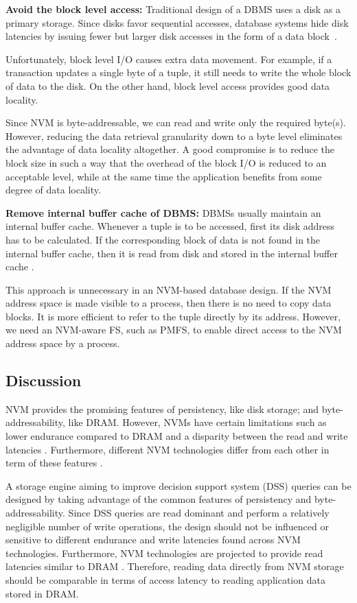 \noindent\textbf{Avoid the block level access:} Traditional design of a DBMS uses a disk as a primary storage. Since disks favor sequential accesses, database systems hide disk latencies by issuing fewer but larger disk accesses in the form of a data block~\cite{schindler2002track}. 

Unfortunately, block level I/O causes extra data movement. For example, if a transaction updates a single byte of a tuple, it still needs to write the whole block of data to the disk. On the other hand, block level access provides good data locality.
 
Since NVM is byte-addressable, we can read and write only the required byte(s). However, reducing the data retrieval granularity down to a byte level eliminates the advantage of data locality altogether. A good compromise is to reduce the block size in such a way that the overhead of the block I/O is reduced to an acceptable level, while at the same time the application benefits from some degree of data locality. 
 
\noindent\textbf{Remove internal buffer cache of DBMS:} DBMSs usually maintain an internal buffer cache. Whenever a tuple is to be accessed, first its disk address has to be calculated. If the corresponding block of data is not found in the internal buffer cache, then it is read from disk and stored in the internal buffer cache \cite{debrabant2013anti}. 
 
This approach is unnecessary in an NVM-based database design. If the NVM address space is made visible to a process, then there is no need to copy data blocks. It is more efficient to refer to the tuple directly by its address. However, we need an NVM-aware FS, such as PMFS, to enable direct access to the NVM address space by a process.
 



\subsection{Discussion}
NVM provides the promising features of persistency, like disk storage; and byte-addressability, like DRAM. However, NVMs
have certain limitations such as lower endurance compared to DRAM \cite{arulraj2015let} and a disparity between the read and write latencies \cite{pelley2014memory}. 
Furthermore, different NVM technologies differ from each other in term of these features \cite{arulraj2015let}.

 
A storage engine aiming to improve decision support
system (DSS) queries can be designed by taking advantage
of the common features of persistency and byte-addressability.
Since DSS queries are read dominant and perform a relatively
negligible number of write operations, the design should
not be influenced or sensitive to different endurance and write
latencies found across NVM technologies. Furthermore, NVM technologies
are projected to provide read latencies similar to DRAM \cite{mittal2016survey,arulraj2015let,wang2013low,chang2012limits}.
Therefore, reading data directly from NVM storage should be comparable in terms
of access latency to reading application data stored in DRAM.

